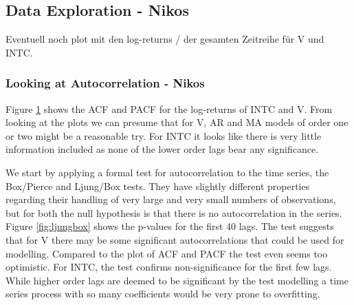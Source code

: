 
\subsection{Data Exploration - Nikos}
Eventuell noch plot mit den log-returns / der gesamten Zeitreihe für V und INTC. 

\subsubsection{Looking at Autocorrelation - Nikos}
Figure \ref{fig:INTC_V_ACF_log_returns} shows the ACF and PACF for the log-returns of INTC and V. From looking at the plots we can presume that for V, AR and MA models of order one or two might be a reasonable try. For INTC it looks like there is very little information included as none of the lower order lags bear any significance. 

We start by applying a formal test for autocorrelation to the time series, the Box/Pierce and Ljung/Box tests. They have slightly different properties regarding their handling of very large and very small numbers of observations, but for both the null hypothesis is that there is no autocorrelation in the series. Figure \ref{fig:ljungbox} shows the p-values for the first 40 lags. The test suggests that for V there may be some significant autocorrelations that could be used for modelling. Compared to the plot of ACF and PACF the test even seems too optimistic. For INTC, the test confirms non-significance for the first few lags. While higher order lags are deemed to be significant by the test modelling a time series process with so many coefficients would be very prone to overfitting. 

\begin{figure}[h]
    \centering
    \begin{adjustbox}{width=.95\textwidth,center}
    
    \end{adjustbox}
    
    \begin{adjustbox}{width=.95\textwidth,center}
    
    \end{adjustbox} 
    
    \caption{}
    \label{fig:INTC_V_ACF_log_returns}
\end{figure}{}

